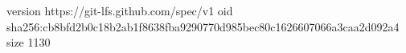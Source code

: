 version https://git-lfs.github.com/spec/v1
oid sha256:cb8bfd2b0c18b2ab1f8638fba9290770d985bec80c1626607066a3caa2d092a4
size 1130
